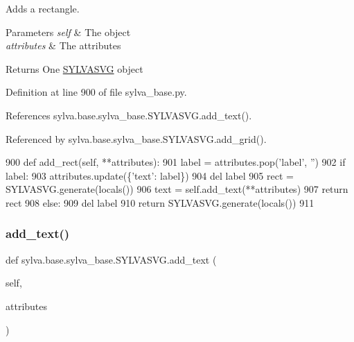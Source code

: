 Adds a rectangle. 


\begin{DoxyParams}{Parameters}
{\em self} & The object \\
\hline
{\em attributes} & The attributes\\
\hline
\end{DoxyParams}
\begin{DoxyReturn}{Returns}
One \hyperlink{classsylva_1_1base_1_1sylva__base_1_1_s_y_l_v_a_s_v_g}{S\+Y\+L\+V\+A\+S\+VG} object 
\end{DoxyReturn}


Definition at line 900 of file sylva\+\_\+base.\+py.



References sylva.\+base.\+sylva\+\_\+base.\+S\+Y\+L\+V\+A\+S\+V\+G.\+add\+\_\+text().



Referenced by sylva.\+base.\+sylva\+\_\+base.\+S\+Y\+L\+V\+A\+S\+V\+G.\+add\+\_\+grid().


\begin{DoxyCode}
900     \textcolor{keyword}{def }add\_rect(self, **attributes):
901         label = attributes.pop(\textcolor{stringliteral}{'label'}, \textcolor{stringliteral}{''})
902         \textcolor{keywordflow}{if} label:
903             attributes.update(\{\textcolor{stringliteral}{'text'}: label\})
904             del label
905             rect = SYLVASVG.generate(locals())
906             text = self.add\_text(**attributes)
907             \textcolor{keywordflow}{return} rect
908         \textcolor{keywordflow}{else}:
909             del label
910             \textcolor{keywordflow}{return} SYLVASVG.generate(locals())
911 
\end{DoxyCode}
\mbox{\label{classsylva_1_1base_1_1sylva__base_1_1_s_y_l_v_a_s_v_g_a436cbf76c9c95b2d5f5e9c2ff087bdb8}} 
\subsubsection{\texorpdfstring{add\+\_\+text()}{add\_text()}}
{\footnotesize\ttfamily def sylva.\+base.\+sylva\+\_\+base.\+S\+Y\+L\+V\+A\+S\+V\+G.\+add\+\_\+text (\begin{DoxyParamCaption}\item[{}]{self,  }\item[{}]{attributes }\end{DoxyParamCaption})}



